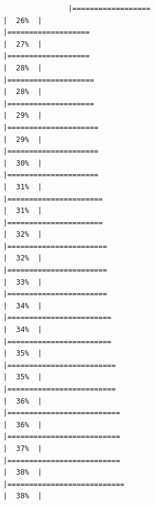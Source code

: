 \documentclass[
]{article}
\begin{document}
\begin{verbatim}
               |==================                                                    |  26%  |                                                                              |===================                                                   |  27%  |                                                                              |===================                                                   |  28%  |                                                                              |====================                                                  |  28%  |                                                                              |====================                                                  |  29%  |                                                                              |=====================                                                 |  29%  |                                                                              |=====================                                                 |  30%  |                                                                              |=====================                                                 |  31%  |                                                                              |======================                                                |  31%  |                                                                              |======================                                                |  32%  |                                                                              |=======================                                               |  32%  |                                                                              |=======================                                               |  33%  |                                                                              |=======================                                               |  34%  |                                                                              |========================                                              |  34%  |                                                                              |========================                                              |  35%  |                                                                              |=========================                                             |  35%  |                                                                              |=========================                                             |  36%  |                                                                              |==========================                                            |  36%  |                                                                              |==========================                                            |  37%  |                                                                              |==========================                                            |  38%  |                                                                              |===========================                                           |  38%  |                                                                
\end{verbatim}
\end{document}
